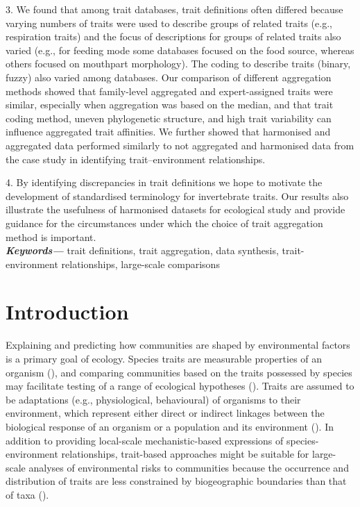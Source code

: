 \documentclass[12pt]{article}
\providecommand{\keywords}[1]
{
  {\small	
  \textbf{\textit{Keywords---}} #1
}}
\begin{document}
3. We found that among trait databases, trait definitions often differed because varying numbers of traits were used to describe groups of related traits (e.g., respiration traits) and the focus of descriptions for groups of related traits also varied (e.g., for feeding mode some databases focused on the food source, whereas others focused on mouthpart morphology). The coding to describe traits (binary, fuzzy) also varied among databases. Our comparison of different aggregation methods showed that family-level aggregated and expert-assigned traits were similar, especially when aggregation was based on the median, and that trait coding method, uneven phylogenetic structure, and high trait variability can influence aggregated trait affinities. We further showed that harmonised and aggregated data performed similarly to not aggregated and harmonised data from the case study in identifying trait–environment relationships.

4. By identifying discrepancies in trait definitions we hope to motivate the development of standardised terminology for invertebrate traits. Our results also illustrate the usefulness of harmonised datasets for ecological study and provide guidance for the circumstances under which the choice of trait aggregation method is important.
\\
\keywords{trait definitions, trait aggregation, data synthesis, trait-environment relationships, large-scale comparisons}


\newpage

\section*{Introduction}

Explaining and predicting how communities are shaped by environmental factors is a primary goal of ecology. Species traits are measurable properties of an organism (\cite{mcgill_rebuilding_2006}), and comparing communities based on the traits possessed by species may facilitate testing of a range of ecological hypotheses (\cite{statzner_perspectives_2001}). Traits are assumed to be adaptations (e.g., physiological, behavioural) of organisms to their environment, which represent either direct or indirect linkages between the biological response of an organism or a population and its environment (\cite{southwood_habitat_1977, verberk_delivering_2013}). In addition to providing local-scale mechanistic-based expressions of species-environment relationships, trait-based approaches might be suitable for large-scale analyses of environmental risks to communities because the occurrence and distribution of traits are less constrained by biogeographic boundaries than that of taxa (\cite{baird_toward_2011, bonada_taxonomic_2007}). 
\end{document}
